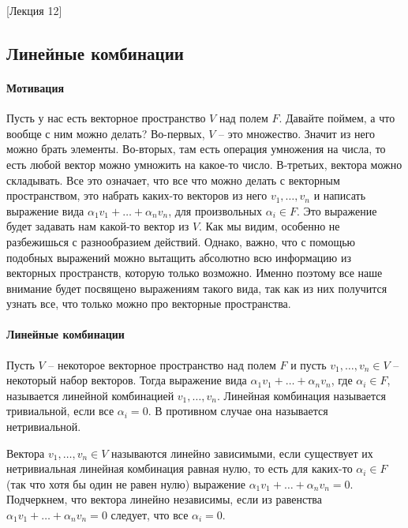 [Лекция 12]


\subsection{Линейные комбинации}

\paragraph{Мотивация}

Пусть у нас есть векторное пространство $V$ над полем $F$.
Давайте поймем, а что вообще с ним можно делать?
Во-первых, $V$ -- это множество.
Значит из него можно брать элементы.
Во-вторых, там есть операция умножения на числа, то есть любой вектор можно умножить на какое-то число.
В-третьих, вектора можно складывать.
Все это означает, что все что можно делать с векторным пространством, это набрать каких-то векторов из него $v_1,\ldots,v_n$ и написать выражение вида $\alpha_1 v_1 + \ldots + \alpha_n v_n$, для произвольных $\alpha_i\in F$.
Это выражение будет задавать нам какой-то вектор из $V$.
Как мы видим, особенно не разбежишься с разнообразием действий.
Однако, важно, что с помощью подобных выражений можно вытащить абсолютно всю информацию из векторных пространств, которую только возможно.
Именно поэтому все наше внимание будет посвящено выражениям такого вида, так как из них получится узнать все, что только можно про векторные пространства.

\paragraph{Линейные комбинации}

\begin{definition}
\label{def::LinComb}
Пусть $V$ -- некоторое векторное пространство над полем $F$ и пусть $v_1,\ldots,v_n\in V$ -- некоторый набор векторов.
Тогда выражение вида $\alpha_1 v_1 +\ldots + \alpha_n v_n$, где $\alpha_i\in F$, называется линейной комбинацией $v_1,\ldots,v_n$.
Линейная комбинация называется тривиальной, если все $\alpha_i = 0$.
В противном случае она называется нетривиальной.
\end{definition}

\begin{definition}
\label{def::LinDep}
Вектора $v_1,\ldots,v_n\in V$ называются линейно зависимыми, если существует их нетривиальная линейная комбинация равная нулю, то есть для каких-то $\alpha_i\in F$ (так что хотя бы один не равен нулю) выражение $\alpha_1 v_1+\ldots + \alpha_n v_n = 0$.
Подчеркнем, что вектора линейно независимы, если из равенства $\alpha_1 v_1 + \ldots + \alpha_n v_n = 0$ следует, что все $\alpha_i = 0$.
\end{definition}

